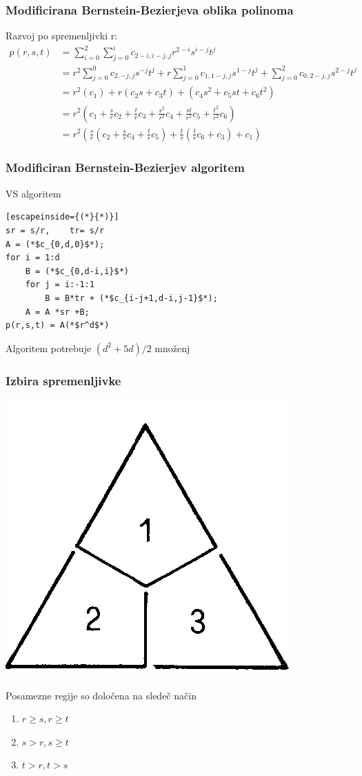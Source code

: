 \documentclass{beamer}
\begin{document}
\begin{frame}
\frametitle{Modificirana Bernstein-Bezierjeva oblika polinoma}
Razvoj po spremenljivki r:
\begin{align}
p(r,s,t) &= \sum_{i=0}^{2}\sum_{j=0}^{i}c_{2-i,i-j,j}r^{2-i}s^{i-j}t^j \nonumber \\ \nonumber
&= r^2\sum_{j=0}^{0}c_{2,-j,j}s^{-j}t^j + r\sum_{j=0}^{1}c_{1,1-j,j}s^{1-j}t^j + \sum_{j=0}^{2}c_{0,2-j,j}s^{2-j}t^j \\ \nonumber
&= r^2(c_1) + r(c_2s+c_3t) + (c_4s^2+c_5st+c_6t^2)\\ \nonumber
&= r^2(c_1+\frac{s}{r}c_2+\frac{t}{r}c_3+\frac{s^2}{r^2}c_4+\frac{st}{r^2}c_5+\frac{t^2}{r^2}c_6) \\ \nonumber
&= r^2(\frac{s}{r}(c_2+\frac{s}{r}c_4+\frac{t}{r}c_5)+\frac{t}{r}(\frac{t}{r}c_6+c_3)+c_1) \nonumber
\end{align}
\end{frame}

\begin{frame}[fragile]
\frametitle{Modificiran Bernstein-Bezierjev algoritem}
\begin{block}{VS algoritem}
\begin{lstlisting}[escapeinside={(*}{*)}]
sr = s/r,	 tr= s/r
A = (*$c_{0,d,0}$*);
for i = 1:d
    B = (*$c_{0,d-i,i}$*)
    for j = i:-1:1
        B = B*tr + (*$c_{i-j+1,d-i,j-1}$*);
    A = A *sr +B;
p(r,s,t) = A(*$r^d$*)
\end{lstlisting}
\end{block}
Algoritem potrebuje $(d^2+5d)/2$ množenj


\end{frame}

\begin{frame}
\frametitle{Izbira spremenljivke}
\begin{center}
\includegraphics[width=.3\linewidth]{graf1.png}
\end{center}

Posamezne regije so določena na sledeč način
\begin{enumerate}
\item  $r \geq s, r \geq t$
\item $s > r, s \geq t$
\item $t>r, t>s$
\end{enumerate}

\end{frame}
\end{document}

